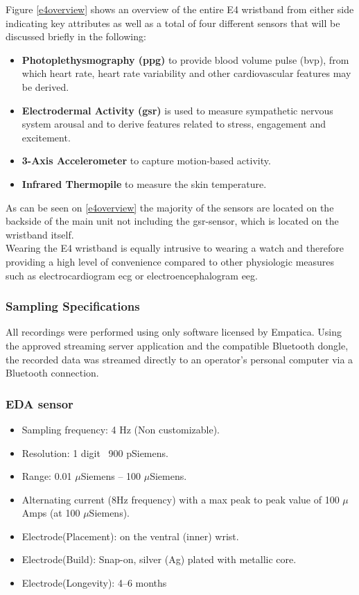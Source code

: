 Figure \ref{e4overview} shows an overview of the entire E4 wristband from either side indicating key attributes as well as a total of four different sensors that will be discussed briefly in the following:

\begin{itemize}
\item \textbf{Photoplethysmography (\gls{ppg})} to provide blood volume pulse (\gls{bvp}), from which heart rate, heart rate variability and other cardiovascular features may be derived.
\item \textbf{Electrodermal Activity (\gls{gsr})} is used to measure sympathetic nervous system arousal and to derive features related to stress, engagement and excitement.
\item \textbf{3-Axis Accelerometer} to capture motion-based activity.
\item \textbf{Infrared Thermopile} to measure the skin temperature.
\end{itemize}

As can be seen on \ref{e4overview} the majority of the sensors are located on the backside of the main unit not including the \gls{gsr}-sensor, which is located on the wristband itself.\\
\newpage
Wearing the E4 wristband is equally intrusive to wearing a watch and therefore providing a high level of convenience compared to other physiologic measures such as electrocardiogram \gls{ecg} or electroencephalogram \gls{eeg}.\\

\subsubsection{Sampling Specifications}
All recordings were performed using only software licensed by Empatica. Using the approved streaming server application and the compatible Bluetooth dongle, the recorded data was streamed directly to an operator's personal computer via a Bluetooth connection. 
\newpage
\subsubsection{EDA sensor}
\begin{itemize}
\item Sampling frequency: 4 Hz (Non customizable).
\item Resolution: 1 digit ~900 pSiemens.
\item Range: 0.01 $\mu$Siemens – 100 $\mu$Siemens.
\item Alternating current (8Hz frequency) with a
max peak to peak value of 100 $\mu$Amps (at 100
$\mu$Siemens).
\item Electrode(Placement): on the ventral (inner) wrist.
\item Electrode(Build): Snap-on, silver (Ag) plated with metallic core.
\item Electrode(Longevity): 4–6 months
\end{itemize}

